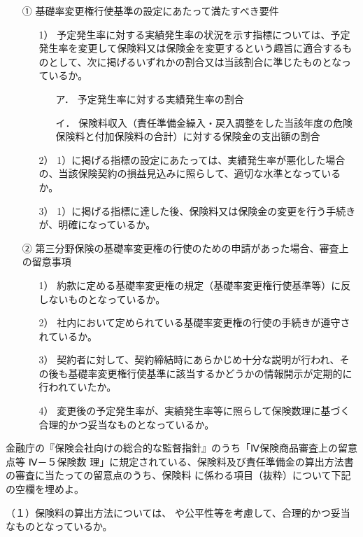 \documentclass[report,gutter=10mm,fore-edge=10mm,uplatex,dvipdfmx]{jlreq}
\begin{document}
\answer{}

\begin{itemize}
\item[①] 基礎率変更権行使基準の設定にあたって満たすべき要件
\begin{itemize}
\item[1）] 予定発生率に対する実績発生率の状況を示す指標については、予定発生率を変更して保険料又は保険金を変更するという趣旨に適合するものとして、次に掲げるいずれかの割合又は当該割合に準じたものとなっているか。
\begin{itemize}
\item[ア．] 予定発生率に対する実績発生率の割合
\item[イ．] 保険料収入（責任準備金繰入・戻入調整をした当該年度の危険保険料と付加保険料の合計）に対する保険金の支出額の割合
\end{itemize}
\item[2）] 1）に掲げる指標の設定にあたっては、実績発生率が悪化した場合の、当該保険契約の損益見込みに照らして、適切な水準となっているか。
\item[3）] 1）に掲げる指標に達した後、保険料又は保険金の変更を行う手続きが、明確になっているか。
\end{itemize}
\item[②] 第三分野保険の基礎率変更権の行使のための申請があった場合、審査上の留意事項
\begin{itemize}
\item[1）] 約款に定める基礎率変更権の規定（基礎率変更権行使基準等）に反しないものとなっているか。
\item[2）] 社内において定められている基礎率変更権の行使の手続きが遵守されているか。
\item[3）] 契約者に対して、契約締結時にあらかじめ十分な説明が行われ、その後も基礎率変更権行使基準に該当するかどうかの情報開示が定期的に行われていたか。
\item[4）] 変更後の予定発生率が、実績発生率等に照らして保険数理に基づく合理的かつ妥当なものとなっているか。
\end{itemize}
\end{itemize}


金融庁の『保険会社向けの総合的な監督指針』のうち「Ⅳ保険商品審査上の留意点等 Ⅳ－５保険数
理」に規定されている、保険料及び責任準備金の算出方法書の審査に当たっての留意点のうち、保険料
に係わる項目（抜粋）について下記の空欄を埋めよ。

（１）保険料の算出方法については、 や公平性等を考慮して、合理的かつ妥当なものとなっているか。
\end{document}
